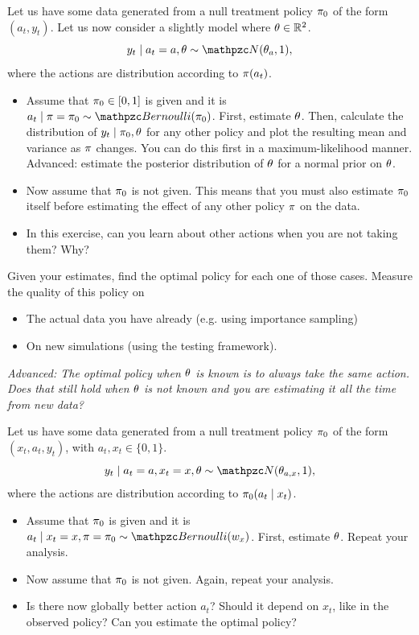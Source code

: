 \begin{frame}
{    \begin{exercise}
      Let us have some data generated from a null treatment policy $\pi_0$ of the form $(a_t, y_t)$. Let us now consider a slightly model where $\theta \in {\mathbb{R}}^2$.
      \[
      y_t \mid a_t = a, \param \sim \Normal(\param_a, 1),
      \]
      where the actions are distribution according to $\pi(a_t)$. 
      \begin{itemize}
      \item Assume that $\pi_0 \in [0,1]$ is given and it is $a_t \mid \pol = \pol_0 \sim \Bernoulli(\pol_0)$. First, estimate $\theta$. Then, calculate the distribution of $y_t \mid \pi_0, \theta$ for any other policy and plot the resulting mean and variance as $\pi$ changes. You can do this first in a maximum-likelihood manner. Advanced: estimate the posterior distribution of $\theta$ for a normal prior on $\theta$.
      \item Now assume that $\pi_0$ is not given. This means that you must also estimate $\pi_0$ itself before estimating the effect of any other policy $\pi$ on the data.
      \item In this exercise, can you learn about other actions when you are not taking them? Why?
      \end{itemize}
    \end{exercise}

    \begin{exercise}
      Given your estimates, find the optimal policy for each one of those cases. Measure the quality of this policy on
      \begin{itemize}
      \item The actual data you have already (e.g. using importance sampling)
      \item On new simulations (using the testing framework).
      \end{itemize}
      \emph{Advanced: The optimal policy when $\theta$ is known is to always take the same action. Does that still hold when $\theta$ is not known and you are estimating it all the time from new data?}
    \end{exercise}


    \begin{exercise}[Advanced]
      Let us have some data generated from a null treatment policy $\pi_0$ of the form $(x_t, a_t, y_t)$, with $a_t, x_t \in \{0, 1\}$.
      \[
      y_t \mid a_t = a, x_t = x, \param \sim \Normal(\param_{a,x}, 1),
      \]
      where the actions are distribution according to $\pi_0(a_t \mid x_t)$. 
      \begin{itemize}
      \item Assume that $\pi_0$ is given and it is $a_t \mid x_t = x, \pol = \pol_0 \sim \Bernoulli(w_{x})$. First, estimate $\theta$. Repeat your analysis.
      \item Now assume that $\pi_0$ is not given.  Again, repeat your analysis.
      \item Is there now globally better action $a_t$? Should it depend on $x_t$, like in the observed policy? Can you estimate the optimal policy?
      \end{itemize}
    \end{exercise}
  }
\end{frame}
